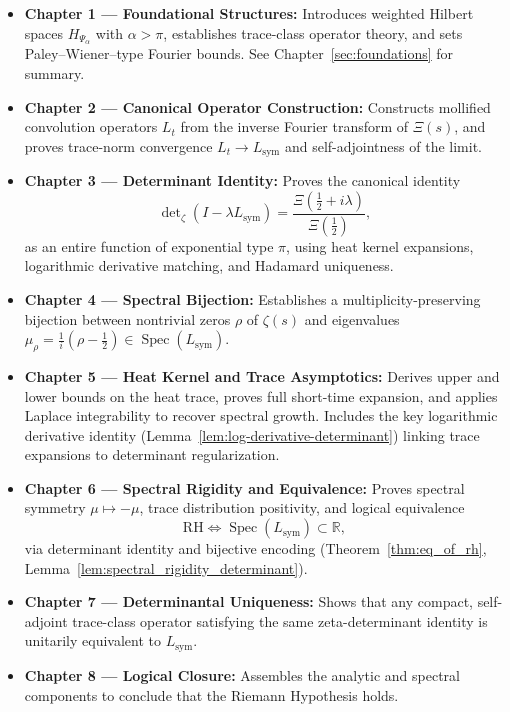 \begin{itemize}
  \item \textbf{Chapter 1 — Foundational Structures:}  
  Introduces weighted Hilbert spaces \( H_{\Psi_\alpha} \) with \( \alpha > \pi \), establishes trace-class operator theory, and sets Paley–Wiener–type Fourier bounds. See Chapter~\ref{sec:foundations} for summary.

  \item \textbf{Chapter 2 — Canonical Operator Construction:}  
  Constructs mollified convolution operators \( L_t \) from the inverse Fourier transform of \( \Xi(s) \), and proves trace-norm convergence \( L_t \to L_{\mathrm{sym}} \) and self-adjointness of the limit.

  \item \textbf{Chapter 3 — Determinant Identity:}  
  Proves the canonical identity
  \[
  \det\nolimits_\zeta(I - \lambda L_{\mathrm{sym}}) = \frac{\Xi(\tfrac{1}{2} + i\lambda)}{\Xi(\tfrac{1}{2})},
  \]
  as an entire function of exponential type \( \pi \), using heat kernel expansions, logarithmic derivative matching, and Hadamard uniqueness.

  \item \textbf{Chapter 4 — Spectral Bijection:}  
  Establishes a multiplicity-preserving bijection between nontrivial zeros \( \rho \) of \( \zeta(s) \) and eigenvalues \( \mu_\rho = \tfrac{1}{i}(\rho - \tfrac{1}{2}) \in \operatorname{Spec}(L_{\mathrm{sym}}) \).

  \item \textbf{Chapter 5 — Heat Kernel and Trace Asymptotics:}  
  Derives upper and lower bounds on the heat trace, proves full short-time expansion, and applies Laplace integrability to recover spectral growth. Includes the key logarithmic derivative identity (Lemma~\ref{lem:log-derivative-determinant}) linking trace expansions to determinant regularization.

  \item \textbf{Chapter 6 — Spectral Rigidity and Equivalence:}  
  Proves spectral symmetry \( \mu \mapsto -\mu \), trace distribution positivity, and logical equivalence
  \[
  \mathrm{RH} \iff \operatorname{Spec}(L_{\mathrm{sym}}) \subset \mathbb{R},
  \]
  via determinant identity and bijective encoding (Theorem~\ref{thm:eq_of_rh}, Lemma~\ref{lem:spectral_rigidity_determinant}).

  \item \textbf{Chapter 7 — Determinantal Uniqueness:}  
  Shows that any compact, self-adjoint trace-class operator satisfying the same zeta-determinant identity is unitarily equivalent to \( L_{\mathrm{sym}} \).

  \item \textbf{Chapter 8 — Logical Closure:}  
  Assembles the analytic and spectral components to conclude that the Riemann Hypothesis holds.
\end{itemize}

